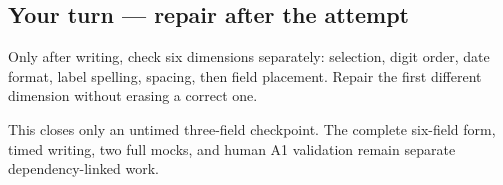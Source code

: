 \subsection*{Your turn — repair after the attempt}
Only after writing, check six dimensions separately: selection, digit order, date format, label spelling, spacing, then field placement. Repair the first different dimension without erasing a correct one.

\begin{tcolorbox}[breakable,colback=teal!4,colframe=teal!35!black,title={Before you move on}]
This closes only an untimed three-field checkpoint. The complete six-field form, timed writing, two full mocks, and human A1 validation remain separate dependency-linked work.
\end{tcolorbox}
